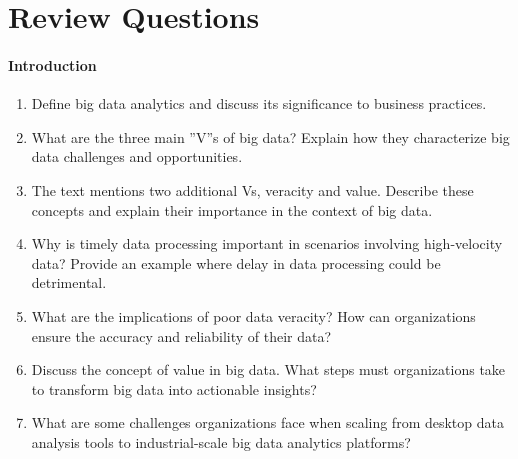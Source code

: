 \FloatBarrier
\section{Review Questions}
\paragraph*{Introduction}
\begin{enumerate}[nosep]
    \item Define big data analytics and discuss its significance to business practices.
    \item What are the three main ''V''s of big data? Explain how they characterize big data challenges and opportunities.
	\item The text mentions two additional Vs, veracity and value. Describe these concepts and explain their importance in the context of big data.
	\item Why is timely data processing important in scenarios involving high-velocity data? Provide an example where delay in data processing could be detrimental.
    \item What are the implications of poor data veracity? How can organizations ensure the accuracy and reliability of their data?
    \item Discuss the concept of value in big data. What steps must organizations take to transform big data into actionable insights?
	\item What are some challenges organizations face when scaling from desktop data analysis tools to industrial-scale big data analytics platforms?
\end{enumerate}
